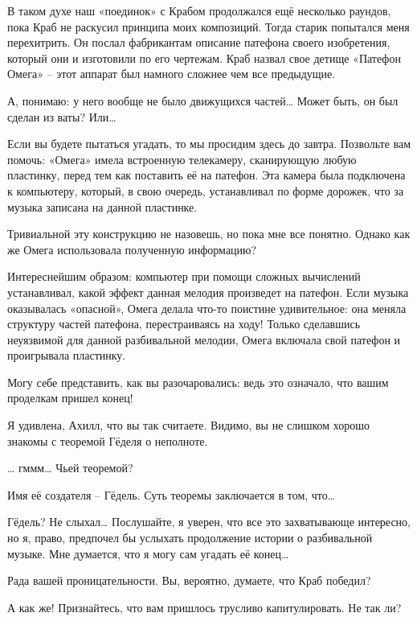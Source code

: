 \documentclass[../main.tex]{subfiles}
\begin{document}
\begin{dialogue}
 В таком духе наш «поединок» с Крабом продолжался ещё несколько раундов, пока Краб не раскусил принципа моих композиций. Тогда старик попытался меня перехитрить. Он послал фабрикантам описание патефона своего изобретения, который они и изготовили по его чертежам. Краб назвал свое детище «Патефон Омега» \--- этот аппарат был намного сложнее чем все предыдущие.

 А, понимаю: у него вообще не было движущихся частей\ldots{} Может быть, он был сделан из ваты? Или\ldots{}

 Если вы будете пытаться угадать, то мы просидим здесь до завтра. Позвольте вам помочь: «Омега» имела встроенную телекамеру, сканирующую любую пластинку, перед тем как поставить её на патефон. Эта камера была подключена к компьютеру, который, в свою очередь, устанавливал по форме дорожек, что за музыка записана на данной пластинке.

 Тривиальной эту конструкцию не назовешь, но пока мне все понятно. Однако как же Омега использовала полученную информацию?

 {\Large И}нтереснейшим образом: компьютер при помощи сложных вычислений устанавливал, какой эффект данная мелодия произведет на патефон. Если музыка оказывалась «опасной», Омега делала что-то поистине удивительное: она меняла структуру частей патефона, перестраиваясь на ходу! Только сделавшись неуязвимой для данной разбивальной мелодии, Омега включала свой патефон и проигрывала пластинку.

 Могу себе представить, как вы разочаровались: ведь это означало, что вашим проделкам пришел конец!

 Я удивлена, Ахилл, что вы так считаете. Видимо, вы не слишком хорошо знакомы с теоремой Гёделя о неполноте.

 \ldots{} гммм\ldots{} Чьей теоремой?

 {\Large И}мя её создателя \--- Гёдель. Суть теоремы заключается в том, что\ldots{}

 Гёдель? Не слыхал\ldots{} Послушайте, я уверен, что все это захватывающе интересно, но я, право, предпочел бы услыхать продолжение истории о разбивальной музыке. Мне думается, что я могу сам угадать её конец\ldots{}

 Рада вашей проницательности. Вы, вероятно, думаете, что Краб победил?

 А как же! Признайтесь, что вам пришлось трусливо капитулировать. Не так ли?


\end{dialogue}
\end{document}
